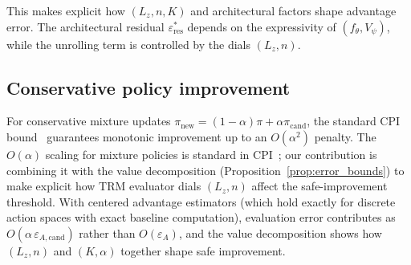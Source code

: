 \documentclass{article}
\theoremstyle{plain}
\theoremstyle{definition}
\theoremstyle{remark}
\newtheorem{remark}[theorem]{Remark}
\newcommand{\shortonly}[1]{#1}
\newcommand{\longonly}[1]{}
\newcommand{\shortonly}[1]{}
\newcommand{\longonly}[1]{#1}
\newcommand{\E}{\mathbb{E}}
\begin{document}
\longonly{
\begin{remark}[Concentrability-adjusted bound]
\label{rem:concentrability}
To make the distribution-shift cost explicit, suppose the replay distribution $\mu$ satisfies:
\begin{equation}
C_\mu^{\{\pi,\pi_{\mathrm{cand}}\}} := \!\sup_{s \in \mathcal{R}_{\{\pi, \pi_{\mathrm{cand}}\}}}\! \frac{\max(d_\pi(s), d_{\pi_{\mathrm{cand}}}(s))}{\mu(s)} < \infty.
\label{eq:concentrability}
\end{equation}
If the value function achieves $L^2(\mu)$ error $\delta_\mu^2 := \E_{s \sim \mu}[(U_n(s) - V^\pi(s))^2]$, then standard uniform convergence arguments~\citep{Chen2019Concentrability} yield, with high probability over training data:
\[
\varepsilon_A \lesssim \sqrt{C_\mu^{\{\pi,\pi_{\mathrm{cand}}\}}} \cdot \delta_\mu + \text{(covering-number terms)}.
\]
The concentrability coefficient $C_\mu$ quantifies coverage: if $\mu$ has poor support on states reachable under $\pi_{\mathrm{cand}}$, the bound degrades.
This is why off-policy replay with diverse exploration is essential.
We do not formalize the covering-number dependence, as it requires specifying the function class; the bound above provides structural intuition.
\end{remark}}

This makes explicit how $(L_z, n, K)$ and architectural factors shape advantage error.
The architectural residual $\varepsilon_{\mathrm{res}}^*$ depends on the expressivity of $(f_\theta, V_\psi)$, while the unrolling term is controlled by the dials $(L_z, n)$.

\shortonly{
\subsection{Conservative policy improvement}
\label{sec:cpi}

For conservative mixture updates $\pi_{\mathrm{new}}=(1-\alpha)\pi+\alpha\pi_{\mathrm{cand}}$, the standard CPI bound~\citep{KakadeLangford2002} guarantees monotonic improvement up to an $O(\alpha^2)$ penalty.
The $O(\alpha)$ scaling for mixture policies is standard in CPI~\citep{KakadeLangford2002}; our contribution is combining it with the value decomposition (Proposition~\ref{prop:error_bounds}) to make explicit how TRM evaluator dials $(L_z, n)$ affect the safe-improvement threshold.
With centered advantage estimators (which hold exactly for discrete action spaces with exact baseline computation), evaluation error contributes as $O(\alpha\,\varepsilon_{A,\mathrm{cand}})$ rather than $O(\varepsilon_A)$, and the value decomposition shows how $(L_z,n)$ and $(K,\alpha)$ together shape safe improvement.
}
\end{document}
